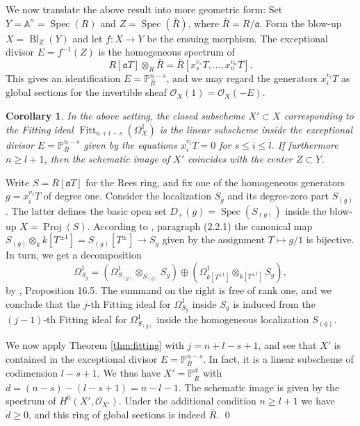 \documentclass[oneside, 12pt]{amsart}
\newtheorem{corollary}[theorem]{Corollary}
\theoremstyle{definition}
\theoremstyle{remark}
\newcommand{\PP}{\mathbb{P}}
\renewcommand{\AA}{\mathbb{A}}
\newcommand{\ideala}{\mathfrak{a}}
\newcommand{\Bl}{\operatorname{Bl}}
\newcommand{\Fitt}{\operatorname{Fitt}}
\renewcommand{\O}{\mathscr{O}}
\newcommand{\Proj}{\operatorname{Proj}}
\newcommand{\ra}{\rightarrow}
\newcommand{\Spec}{\operatorname{Spec}}
\begin{document}
\medskip
We now translate the above result into more geometric form: Set $Y=\AA^n=\Spec(R)$ and $Z=\Spec(\bar{R})$, where $\bar{R}=R/\ideala$.
Form  the blow-up $X=\Bl_Z(Y)$  and let $f:X\ra Y$ be the ensuing morphism.
The exceptional divisor $E=f^{-1}(Z)$ is the homogeneous spectrum of 
$$
R[\ideala T]\otimes_R\bar{R}=\bar{R}[x_s^{v_s}T,\ldots,x_n^{v_n}T].
$$
This gives an identification $E=\PP^{n-s}_{\bar{R}}$, and we may regard the generators $x_i^{v_i}T$ as global sections
for the invertible sheaf $\O_X(1)=\O_X(-E)$.

\begin{corollary}
\label{blowing up affine space}
In the above setting, the closed subscheme $X'\subset X$ corresponding to the Fitting ideal 
$\Fitt_{n+l-s}(\Omega^1_X)$
is the linear subscheme  inside the exceptional divisor $E=\PP^{n-s}_{\bar{R}}$  
given by the equations $x_i^{v_i}T=0$ for $s\leq i\leq l$. If furthermore $n\geq l+1$, 
then the schematic image of $X'$
coincides with the center $Z\subset Y$.
\end{corollary}

\proof
Write $S=R[\ideala T]$ for the Rees ring, and fix  one of the homogeneous generators $g=x_i^{v_i}T$ of degree one.
Consider  the localization $S_g$ and its degree-zero part $S_{(g)}$.
The latter defines the basic open set   $D_+(g) = \Spec(S_{(g)})$ 
inside the blow-up $X=\Proj(S)$.
According to \cite{EGA II}, paragraph (2.2.1) the canonical map
$S_{(g)}\otimes_k k[T^{\pm 1}]= S_{(g)}[T^{\pm}]\ra S_g$ given by the assignment $T\mapsto g/1$
is bijective. In turn, we get a  decomposition
$$
\Omega^1_{S_g} = (\Omega^1_{S_{(g)}} \otimes_{S_{(g)}} S_g) \oplus (\Omega^1_{k[T^{\pm 1}]} \otimes_{k[T^{\pm1}]} S_g),
$$
by \cite{Eisenbud 1995}, Proposition 16.5.
The summand on the right is free of rank one, and we conclude that the $j$-th Fitting ideal 
for $\Omega^1_{S_g}$ inside $S_g$ is induced from the $(j-1)$-th Fitting ideal
for $\Omega^1_{S_{(g)}}$ inside the homogeneous localization $S_{(g)}$.

We now apply Theorem \ref{thm:fitting}
with $j=n+l-s+1$, and see that $X'$ is contained in the exceptional divisor $E=\PP^{n-s}_{\bar{R}}$.
In fact, it is a linear subscheme  of codimension $l-s+1$. We thus have $X'=\PP^d_{\bar{R}}$ with
$d=(n-s)-(l-s+1) = n-l-1$. The schematic image is given by the spectrum of $H^0(X',\O_{X'})$.
Under the additional condition $n\geq l+1$ we have $d\geq 0$, and this ring of global sections is indeed $\bar{R}$. 
\qed


\end{document}
